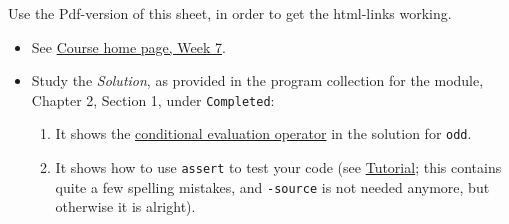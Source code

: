\documentclass[11pt]{article}
\begin{document}
Use the Pdf-version of this sheet, in order to get the html-links working.
\begin{itemize}
\item See \href{\chp#ExercisesWeek07}{Course home page, Week 7}.
\item Study the \emph{Solution}, as provided in the program collection for the module, Chapter 2, Section 1, under \texttt{Completed}:
  \begin{enumerate}
  \item It shows the \href{http://www.cafeaulait.org/course/week2/43.html}{conditional evaluation operator} in the solution for \texttt{odd}.
  \item It shows how to use \texttt{assert} to test your code (see \href{http://sqa.fyicenter.com/FAQ/JUnit/What_Is_Java_assert_Statement_.html}{Tutorial}; this contains quite a few spelling mistakes, and \texttt{-source} is not needed anymore, but otherwise it is alright).
  \end{enumerate}
\end{itemize}
\end{document}
